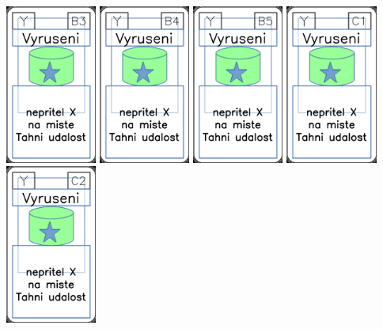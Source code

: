 \documentclass[a4paper]{article}
\begin{document}
	\includegraphics[width=3.0cm]{img-5_37}
	\includegraphics[width=3.0cm]{img-5_38}
	\includegraphics[width=3.0cm]{img-5_39}
	\includegraphics[width=3.0cm]{img-5_40}
	\includegraphics[width=3.0cm]{img-5_41}
\end{document}
